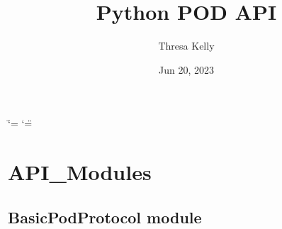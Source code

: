 \documentclass[letterpaper,10pt,english]{sphinxmanual}
\title{Python POD API}
\date{Jun 20, 2023}
\author{Thresa Kelly}
\begin{document}
\ifdefined\shorthandoff
  \ifnum\catcode`\=\string=\active\shorthandoff{=}\fi
  \ifnum\catcode`\"=\active{}\fi
\fi

\pagestyle{empty}
\sphinxmaketitle
\pagestyle{plain}
\sphinxtableofcontents
\pagestyle{normal}
\label{\detokenize{index::doc}}


\sphinxstepscope


\chapter{API\_Modules}
\label{\detokenize{modules:api-modules}}\label{\detokenize{modules::doc}}
\sphinxstepscope


\section{BasicPodProtocol module}
\label{\detokenize{BasicPodProtocol:module-BasicPodProtocol}}\label{\detokenize{BasicPodProtocol:basicpodprotocol-module}}\label{\detokenize{BasicPodProtocol::doc}}
\end{document}
